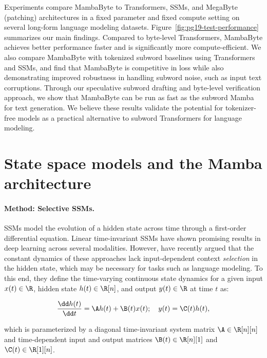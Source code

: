 Experiments compare MambaByte to Transformers, SSMs, and MegaByte (patching) architectures in a fixed parameter and fixed compute setting on several long-form language modeling datasets. Figure~\ref{fig:pg19-test-performance} summarizes our main findings. Compared to byte-level Transformers, MambaByte achieves better performance faster and is significantly more compute-efficient. We also compare MambaByte with tokenized subword baselines using Transformers and SSMs, and find that MambaByte is competitive in loss while also demonstrating improved robustness in handling subword noise, such as input text corruptions. Through our speculative subword drafting and byte-level verification approach, we show that MambaByte can be run as fast as the subword Mamba for text generation. We believe these results validate the potential for tokenizer-free models as a practical alternative to subword Transformers for language modeling.

\section{State space models and the Mamba architecture}
\label{sec:model}

\paragraph{Method: Selective SSMs.} SSMs model the evolution of a hidden state across time through a first-order differential equation. Linear time-invariant SSMs \citep{gu2021efficiently,gupta2022diagonal,gu2022parameterization,smith2023simplified} have shown promising results in deep learning across several modalities. However, \citet{gu2023mamba} have recently argued that the constant dynamics of these approaches lack input-dependent context \textit{selection} in the hidden state, which may be necessary for tasks such as language modeling. To this end, they define the time-varying continuous state dynamics for a given input $x(t) \in \R$, hidden state $h(t) \in \R[n]$, and output $y(t) \in \R$ at time $t$ as:

\begin{align}
\label{eq:mamba}
    \frac{{\dd}h(t)}{{\dd}t} = {\A}h(t) + \B(t) x(t); \quad y(t) = \C(t) h(t),
\end{align}

which is parameterized by a diagonal time-invariant system matrix $\A \in \R[n][n]$ and time-dependent input and output matrices $\B(t) \in \R[n][1]$ and $\C(t) \in \R[1][n]$.

